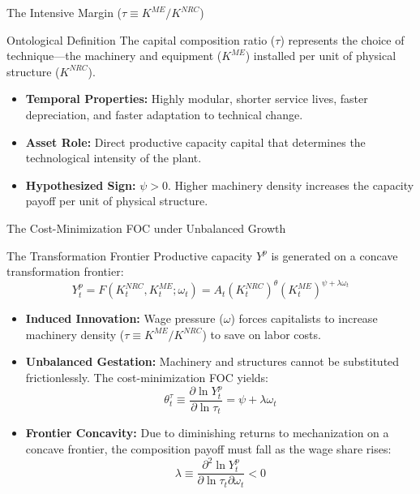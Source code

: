 \documentclass[10pt]{beamer}
\begin{document}
\begin{frame}{The Intensive Margin ($\tau \equiv K^{ME} / K^{NRC}$)}
  \begin{block}{Ontological Definition}
    The capital composition ratio ($\tau$) represents the choice of technique—the machinery and equipment ($K^{ME}$) installed per unit of physical structure ($K^{NRC}$).
  \end{block}
  \begin{itemize}
    \item \textbf{Temporal Properties:} Highly modular, shorter service lives, faster depreciation, and faster adaptation to technical change.
    \item \textbf{Asset Role:} Direct productive capacity capital that determines the technological intensity of the plant.
    \item \textbf{Hypothesized Sign:} $\psi > 0$. Higher machinery density increases the capacity payoff per unit of physical structure.
  \end{itemize}
\end{frame}

\begin{frame}{The Cost-Minimization FOC under Unbalanced Growth}
  \begin{block}{The Transformation Frontier}
    Productive capacity $Y^p$ is generated on a concave transformation frontier:
    $$Y^p_t = F(K^{NRC}_t, K^{ME}_t; \omega_t) = A_t (K^{NRC}_t)^{\theta} (K^{ME}_t)^{\psi + \lambda \omega_t}$$
  \end{block}
  \begin{itemize}
    \item \textbf{Induced Innovation:} Wage pressure ($\omega$) forces capitalists to increase machinery density ($\tau \equiv K^{ME} / K^{NRC}$) to save on labor costs.
    \item \textbf{Unbalanced Gestation:} Machinery and structures cannot be substituted frictionlessly. The cost-minimization FOC yields:
      $$\theta^{\tau}_t \equiv \frac{\partial \ln Y^p_t}{\partial \ln \tau_t} = \psi + \lambda \omega_t$$
    \item \textbf{Frontier Concavity:} Due to diminishing returns to mechanization on a concave frontier, the composition payoff must fall as the wage share rises:
      $$\lambda \equiv \frac{\partial^2 \ln Y^p_t}{\partial \ln \tau_t \partial \omega_t} < 0$$
  \end{itemize}
\end{frame}
\end{document}
